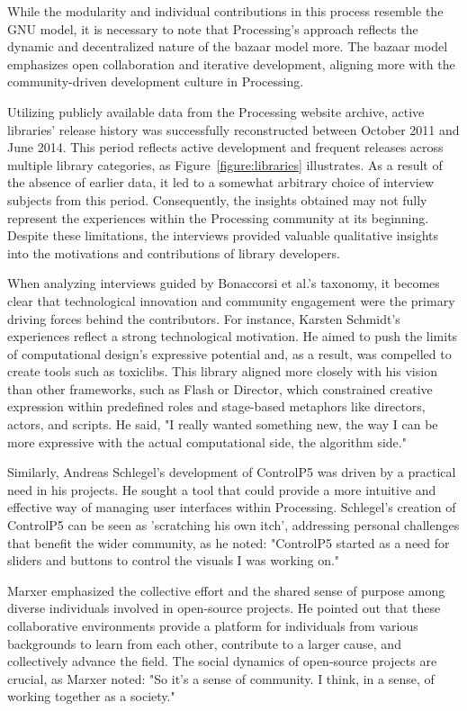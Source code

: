 While the modularity and individual contributions in this process resemble the GNU model, it is necessary to note that Processing's approach reflects the dynamic and decentralized nature of the bazaar model more. The bazaar model emphasizes open collaboration and iterative development, aligning more with the community-driven development culture in Processing.

Utilizing publicly available data from the Processing website archive, active libraries' release history was successfully reconstructed between October 2011 and June 2014. This period reflects active development and frequent releases across multiple library categories, as Figure~\ref*{figure:libraries} illustrates. As a result of the absence of earlier data, it led to a somewhat arbitrary choice of interview subjects from this period. Consequently, the insights obtained may not fully represent the experiences within the Processing community at its beginning. Despite these limitations, the interviews provided valuable qualitative insights into the motivations and contributions of library developers. 


When analyzing interviews guided by Bonaccorsi et al.'s taxonomy, it becomes clear that technological innovation and community engagement were the primary driving forces behind the contributors. For instance, Karsten Schmidt's experiences reflect a strong technological motivation. He aimed to push the limits of computational design's expressive potential and, as a result, was compelled to create tools such as toxiclibs. This library aligned more closely with his vision than other frameworks, such as Flash or Director, which constrained creative expression within predefined roles and stage-based metaphors like directors, actors, and scripts. He said, "I really wanted something new, the way I can be more expressive with the actual computational side, the algorithm side."

Similarly, Andreas Schlegel's development of ControlP5 was driven by a practical need in his projects. He sought a tool that could provide a more intuitive and effective way of managing user interfaces within Processing. Schlegel's creation of ControlP5 can be seen as 'scratching his own itch', addressing personal challenges that benefit the wider community, as he noted: "ControlP5 started as a need for sliders and buttons to control the visuals I was working on."

Marxer emphasized the collective effort and the shared sense of purpose among diverse individuals involved in open-source projects. He pointed out that these collaborative environments provide a platform for individuals from various backgrounds to learn from each other, contribute to a larger cause, and collectively advance the field. The social dynamics of open-source projects are crucial, as Marxer noted: "So it's a sense of community. I think, in a sense, of working together as a society."

